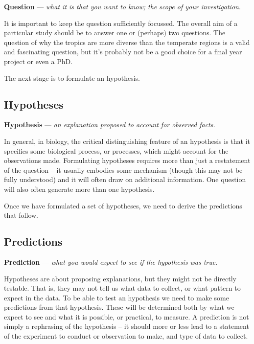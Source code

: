 \documentclass[
]{book}
\begin{document}
\textbf{Question} --- \emph{what it is that you want to know; the scope of your investigation}.

It is important to keep the question sufficiently focussed. The overall aim of a particular study should be to answer one or (perhaps) two questions. The question of why the tropics are more diverse than the temperate regions is a valid and fascinating question, but it's probably not be a good choice for a final year project or even a PhD.

The next stage is to formulate an hypothesis.

\hypertarget{stages-hypotheses}{%
\subsection{Hypotheses}\label{stages-hypotheses}}

\textbf{Hypothesis} --- \emph{an explanation proposed to account for observed facts.}

In general, in biology, the critical distinguishing feature of an hypothesis is that it specifies some biological process, or processes, which might account for the observations made. Formulating hypotheses requires more than just a restatement of the question -- it usually embodies some mechanism (though this may not be fully understood) and it will often draw on additional information. One question will also often generate more than one hypothesis.

Once we have formulated a set of hypotheses, we need to derive the predictions that follow.

\hypertarget{stages-predictions}{%
\subsection{Predictions}\label{stages-predictions}}

\textbf{Prediction} --- \emph{what you would expect to see if the hypothesis was true}.

Hypotheses are about proposing explanations, but they might not be directly testable. That is, they may not tell us what data to collect, or what pattern to expect in the data. To be able to test an hypothesis we need to make some predictions from that hypothesis. These will be determined both by what we expect to see and what it is possible, or practical, to measure. A prediction is not simply a rephrasing of the hypothesis -- it should more or less lead to a statement of the experiment to conduct or observation to make, and type of data to collect.
\end{document}
